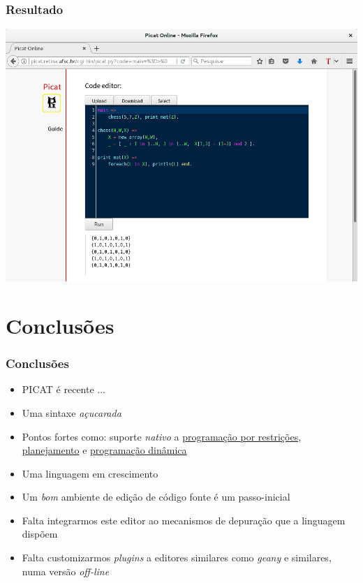 \documentclass[brazil]{beamer}
\begin{document}
\begin{frame}

    \frametitle{Resultado}

\begin{center}
\includegraphics[width=.8\textwidth]{figures/resultado.png}
\end{center}
\end{frame}

\section{Conclusões}


\begin{frame}

    \frametitle{Conclusões}

    \begin{itemize}
      \item PICAT é recente ... 
      \pause
      \item Uma sintaxe \emph{açucarada}
      \pause
      \item Pontos fortes como: suporte \emph{nativo} a \underline{programação por restrições}, \underline{planejamento} e \underline{programação dinâmica}
      \pause
      \item Uma linguagem em crescimento

      \pause
      \item Um \emph{bom} ambiente de edição de código fonte é um passo-inicial
      
       \pause
      \item Falta integrarmos este editor ao mecanismos de depuração que a linguagem dispõem
      
        \pause
      \item Falta customizarmos \emph{plugins} a editores similares como \emph{geany} e similares, numa versão \emph{off-line}
      
    \end{itemize}
\end{frame}
\end{document}
